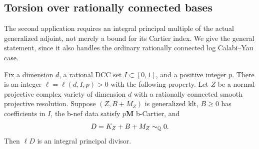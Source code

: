 \subsection{Torsion over rationally connected bases}

The second application requires an integral principal multiple of
the actual generalized adjoint, not merely a bound for its Cartier
index.  We give the general statement, since it also handles the
ordinary rationally connected log Calabi--Yau case.

\begin{proposition}\label{prop:rc-torsion}
Fix a dimension $d$, a rational DCC set $I\subset[0,1]$, and a
positive integer $p$.  There is an integer $\ell=\ell(d,I,p)>0$
with the following property.  Let $Z$ be a normal projective complex
variety of dimension $d$ with a rationally connected smooth
projective resolution.  Suppose $(Z,B+M_Z)$ is generalized klt,
$B\geq0$ has coefficients in $I$, the b-nef data satisfy
$p\mathbf M$ b-Cartier, and
\[
 D=K_Z+B+M_Z\sim_{\mathbb Q}0.
\]
Then $\ell D$ is an integral principal divisor.
\end{proposition}

